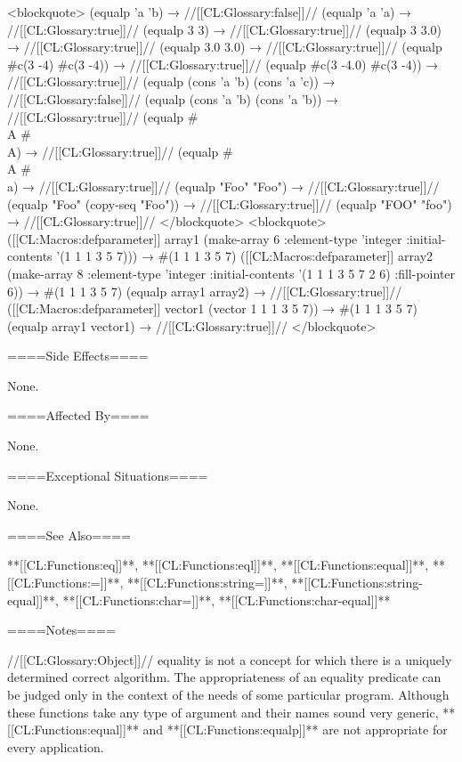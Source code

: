 <blockquote> (equalp 'a 'b) → //[[CL:Glossary:false]]// (equalp 'a 'a) → //[[CL:Glossary:true]]// (equalp 3 3) → //[[CL:Glossary:true]]// (equalp 3 3.0) → //[[CL:Glossary:true]]// (equalp 3.0 3.0) → //[[CL:Glossary:true]]// (equalp #c(3 -4) #c(3 -4)) → //[[CL:Glossary:true]]// (equalp #c(3 -4.0) #c(3 -4)) → //[[CL:Glossary:true]]// (equalp (cons 'a 'b) (cons 'a 'c)) → //[[CL:Glossary:false]]// (equalp (cons 'a 'b) (cons 'a 'b)) → //[[CL:Glossary:true]]// (equalp #\\A #\\A) → //[[CL:Glossary:true]]// (equalp #\\A #\\a) → //[[CL:Glossary:true]]// (equalp "Foo" "Foo") → //[[CL:Glossary:true]]// (equalp "Foo" (copy-seq "Foo")) → //[[CL:Glossary:true]]// (equalp "FOO" "foo") → //[[CL:Glossary:true]]// </blockquote> <blockquote> ([[CL:Macros:defparameter]] array1 (make-array 6 :element-type 'integer :initial-contents '(1 1 1 3 5 7))) → #(1 1 1 3 5 7) ([[CL:Macros:defparameter]] array2 (make-array 8 :element-type 'integer :initial-contents '(1 1 1 3 5 7 2 6) :fill-pointer 6)) → #(1 1 1 3 5 7) (equalp array1 array2) → //[[CL:Glossary:true]]// ([[CL:Macros:defparameter]] vector1 (vector 1 1 1 3 5 7)) → #(1 1 1 3 5 7) (equalp array1 vector1) → //[[CL:Glossary:true]]// </blockquote>

====Side Effects====

None.

====Affected By====

None.

====Exceptional Situations====

None.

====See Also====

**[[CL:Functions:eq]]**, **[[CL:Functions:eql]]**, **[[CL:Functions:equal]]**, **[[CL:Functions:=]]**, **[[CL:Functions:string=]]**, **[[CL:Functions:string-equal]]**, **[[CL:Functions:char=]]**, **[[CL:Functions:char-equal]]**

====Notes====

//[[CL:Glossary:Object]]// equality is not a concept for which there is a uniquely determined correct algorithm. The appropriateness of an equality predicate can be judged only in the context of the needs of some particular program. Although these functions take any type of argument and their names sound very generic, **[[CL:Functions:equal]]** and **[[CL:Functions:equalp]]** are not appropriate for every application.

  
